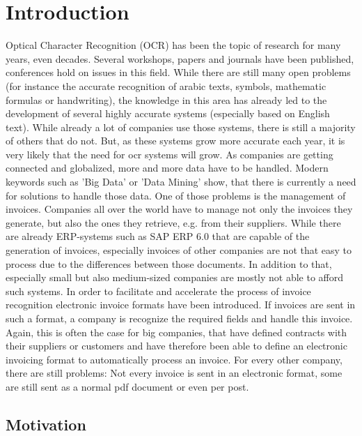 %
% 

\chapter{Introduction}
Optical Character Recognition (OCR) has been the topic of research for many years, even decades. Several workshops, papers and journals have been published, conferences hold on issues in this field. While there are still many open problems (for instance the accurate recognition of arabic texts, symbols, mathematic formulas or handwriting), the knowledge in this area has already led to the development of several highly accurate systems (especially based on English text).
While already a lot of companies use those systems, there is still a majority of others that do not. But, as these systems grow more accurate each year, it is very likely that the need for ocr systems will grow.
As companies are getting connected and globalized, more and more data have to be handled. Modern keywords such as 'Big Data' or 'Data Mining' show, that there is currently a need for solutions to handle those data.
One of those problems is the management of invoices. Companies all over the world have to manage not only the invoices they generate, but also the ones they retrieve, e.g. from their suppliers. While there are already ERP-systems such as SAP ERP 6.0 that are capable of the generation of invoices, especially invoices of other companies are not that easy to process due to the differences between those documents. In addition to that, especially small but also medium-sized companies are mostly not able to afford such systems.
In order to facilitate and accelerate the process of invoice recognition electronic invoice formats have been introduced. If invoices are sent in such a format, a company is recognize the required fields and handle this invoice. Again, this is often the case for big companies, that have defined contracts with their suppliers or customers and have therefore been able to define an electronic invoicing format to automatically process an invoice.
For every other company, there are still problems: Not every invoice is sent in an electronic format, some are still sent as a normal pdf document or even per post.

\section{Motivation}

